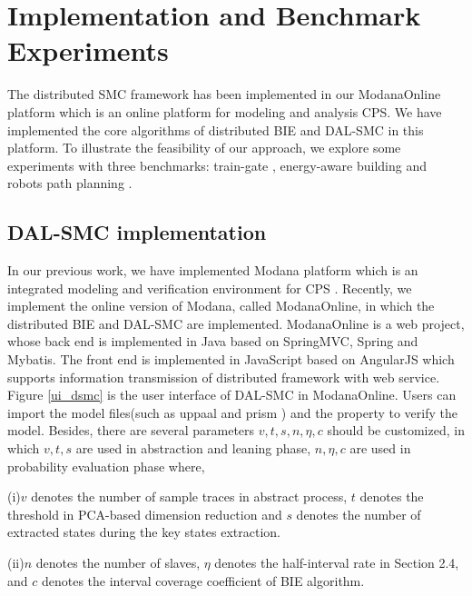 \section{Implementation and Benchmark Experiments}
The distributed SMC framework has been implemented in our ModanaOnline platform which is an online platform for modeling and analysis CPS. We have implemented the core algorithms of distributed BIE and DAL-SMC in this platform. To illustrate the feasibility of our approach, we explore some experiments with three benchmarks: train-gate \cite{David2015Uppaal}, energy-aware building \cite{david2012evaluation} and robots path planning \cite{Miura2000Modeling}.

\subsection{DAL-SMC implementation}
In our previous work, we have implemented Modana platform which is an integrated modeling and verification environment for CPS \cite{Cheng2015Modana}. Recently, we implement the online version of Modana, called ModanaOnline, in which the distributed BIE and DAL-SMC are implemented. ModanaOnline is a web project, whose back end is implemented in Java based on SpringMVC, Spring and Mybatis. The front end is implemented in JavaScript based on AngularJS which supports information transmission of distributed framework with web service. Figure \ref{ui_dsmc} is the user interface of DAL-SMC in ModanaOnline. Users can import the model files(such as uppaal \cite{Behrmann2006UPPAAL} and prism \cite{Kwiatkowska2002PRISM}) and the property to verify the model. Besides, there are several parameters $v,t,s,n,\eta,c$ should be customized, in which $v,t,s$ are used in abstraction and leaning phase, $n,\eta,c$ are used in probability evaluation phase where,

(i)$v$ denotes the number of sample traces in abstract process, $t$ denotes the threshold in PCA-based dimension reduction and $s$ denotes the number of extracted states during the key states extraction.

(ii)$n$ denotes the number of slaves, $\eta$ denotes the half-interval rate in Section 2.4, and $c$ denotes the interval coverage coefficient of BIE algorithm.

